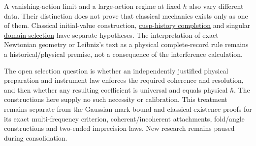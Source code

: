 \documentclass[11pt,a4paper]{article}
\begin{document}
A vanishing-action limit and a large-action regime at fixed \(h\) also
vary different data. Their distinction does not prove that classical
mechanics exists only as one of them. Classical initial-value
construction,
\href{newton-cusp-preparation-floor.md\#2-the-trajectory-state-completion}{cusp-history
completion} and singular \href{self-sufficiency-contrast.md}{domain
selection} have separate hypotheses. The interpretation of exact
Newtonian geometry or Leibniz's text as a physical complete-record rule
remains a historical/physical premise, not a consequence of the
interference calculation.

The open selection question is whether an independently justified
physical preparation and instrument law enforces the required coherence
and resolution, and then whether any resulting coefficient is universal
and equals physical \(\hbar\). The constructions here supply no such
necessity or calibration. This treatment remains separate from the
Gaussian mark bound and classical existence proofs for its exact
multi-frequency criterion, coherent/incoherent attachments, fold/angle
constructions and two-ended imprecision laws. New research remains
paused during consolidation.
\end{document}

